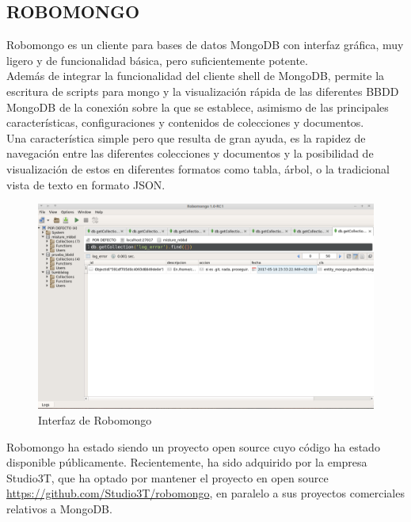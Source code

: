 \subsection{ROBOMONGO}
\label{subsec:robomongo}

Robomongo es un cliente para bases de datos MongoDB con interfaz gráfica, muy ligero y de funcionalidad básica, pero suficientemente potente.\\


Además de integrar la funcionalidad del cliente shell de MongoDB, permite la escritura de scripts para mongo y la visualización rápida de las diferentes BBDD MongoDB de la conexión sobre la que se establece, asimismo de las principales características, configuraciones y contenidos de colecciones y documentos.\\


Una característica simple pero que resulta de gran ayuda, es la rapidez de navegación entre las diferentes colecciones y documentos y la posibilidad de visualización de estos en diferentes formatos como tabla, árbol, o la tradicional vista de texto en formato JSON.\\


\begin{figure}[H]
   \centering
   \includegraphics[width=16cm]{img/robomongo}
   \caption{Interfaz de Robomongo}
   \label{figura:robomongo}
\end{figure}


Robomongo ha estado siendo un proyecto open source cuyo código ha estado disponible públicamente. Recientemente, ha sido adquirido por la empresa Studio3T, que ha optado por mantener el proyecto en  open source \url{https://github.com/Studio3T/robomongo}, en paralelo a sus proyectos comerciales relativos a MongoDB.
